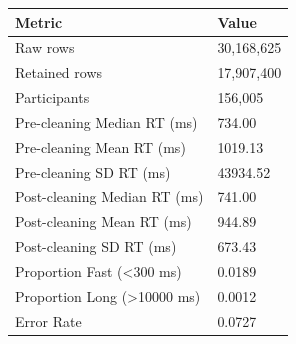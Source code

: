 \begin{tabular}{ll}
\toprule
Metric & Value \\
\midrule
Raw rows & 30,168,625 \\
Retained rows & 17,907,400 \\
Participants & 156,005 \\
Pre-cleaning Median RT (ms) & 734.00 \\
Pre-cleaning Mean RT (ms) & 1019.13 \\
Pre-cleaning SD RT (ms) & 43934.52 \\
Post-cleaning Median RT (ms) & 741.00 \\
Post-cleaning Mean RT (ms) & 944.89 \\
Post-cleaning SD RT (ms) & 673.43 \\
Proportion Fast (<300 ms) & 0.0189 \\
Proportion Long (>10000 ms) & 0.0012 \\
Error Rate & 0.0727 \\
\bottomrule
\end{tabular}
